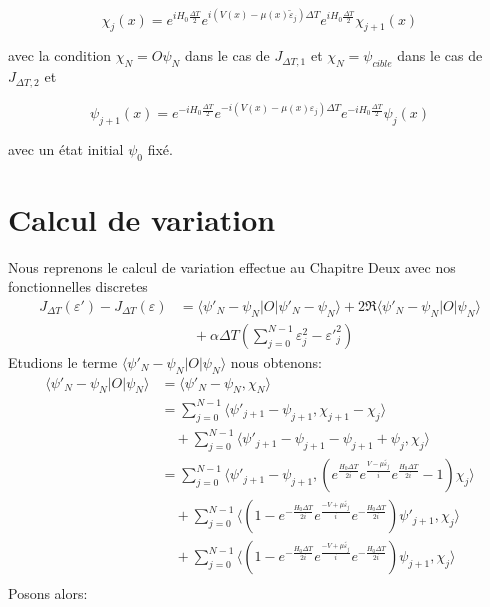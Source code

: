 \begin{equation}
\chi_j(x) = e^{iH_0\frac{\Delta T}{2}} e^{i(V(x)-\mu(x)\tilde{\varepsilon}_j)\Delta T} e^{iH_0\frac{\Delta T}{2}} \chi_{j+1}(x)
\end{equation}

avec la condition $\chi_N = O\psi_N$ dans le cas de $J_{\Delta T,1}$ et $\chi_N = \psi_{cible}$ dans le cas de $J_{\Delta T,2}$ et

\begin{equation}
\psi_{j+1}(x) = e^{-iH_0\frac{\Delta T}{2}} e^{-i(V(x)-\mu(x)\varepsilon_j)\Delta T} e^{-iH_0\frac{\Delta T}{2}} \psi_j(x)
\end{equation}

avec un état initial $\psi_0$ fixé.

\section{Calcul de variation}
Nous reprenons le calcul de variation effectue au Chapitre Deux avec nos fonctionnelles discretes
\begin{align*}
J_{\Delta T}(\varepsilon')-J_{\Delta T}(\varepsilon) &= \langle \psi'_N-\psi_N |O|\psi'_N-\psi_N \rangle + 2\Re \langle \psi'_N-\psi_N |O|\psi_N \rangle\\
&\quad +\alpha \Delta T (\sum_{j=0}^{N -1} \varepsilon_j^2-{\varepsilon'}_j^{2})
\end{align*}
Etudions le terme $\langle \psi'_N-\psi_N |O|\psi_N \rangle$ nous obtenons:
\begin{align*}
\langle \psi'_N-\psi_N |O|\psi_N \rangle &= \langle \psi'_N-\psi_N , \chi_N \rangle\\
&=\sum_{j=0}^{N-1} \langle \psi'_{j+1}-\psi_{j+1} , \chi_{j+1}-\chi_{j} \rangle\\
&\quad + \sum_{j=0}^{N-1} \langle \psi'_{j+1}-\psi_{j+1}-\psi_{j+1}+\psi_{j}, \chi_{j} \rangle\\
&=\sum_{j=0}^{N-1} \langle \psi'_{j+1}-\psi_{j+1} , (e^{\frac{H_0\Delta T}{2i}} e^{\frac{V-\mu\tilde{\varepsilon_j}}{i}} e^{\frac{H_0\Delta T}{2i}}-1)\chi_{j} \rangle\\
&\quad + \sum_{j=0}^{N-1} \langle (1-e^{-\frac{H_0\Delta T}{2i}} e^{\frac{-V+\mu\tilde{\varepsilon_j}}{i}} e^{-\frac{H_0\Delta T}{2i}}) \psi'_{j+1}, \chi_{j} \rangle\\
&\quad + \sum_{j=0}^{N-1} \langle (1-e^{-\frac{H_0\Delta T}{2i}} e^{\frac{-V+\mu\tilde{\varepsilon_j}}{i}} e^{-\frac{H_0\Delta T}{2i}}) \psi_{j+1}, \chi_{j} \rangle\\
\end{align*}
Posons alors:

